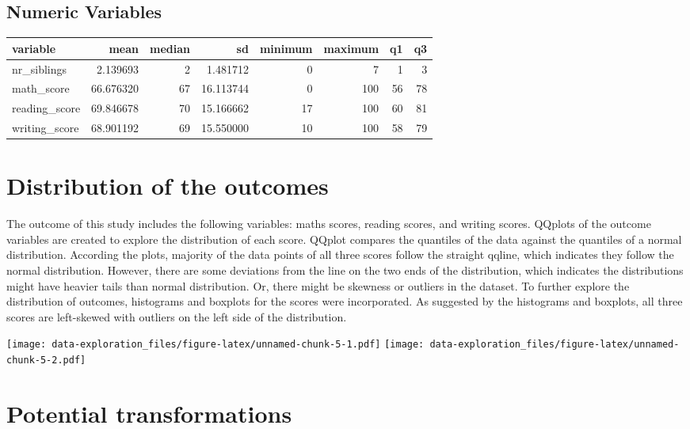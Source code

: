 \documentclass[
  12pt,
]{article}
\begin{document}
\hypertarget{numeric-variables}{%
\subsection{Numeric Variables}\label{numeric-variables}}

\begin{longtable}[]{@{}lrrrrrrr@{}}
\toprule\noalign{}
variable & mean & median & sd & minimum & maximum & q1 & q3 \\
\midrule\noalign{}
\endhead
\bottomrule\noalign{}
\endlastfoot
nr\_siblings & 2.139693 & 2 & 1.481712 & 0 & 7 & 1 & 3 \\
math\_score & 66.676320 & 67 & 16.113744 & 0 & 100 & 56 & 78 \\
reading\_score & 69.846678 & 70 & 15.166662 & 17 & 100 & 60 & 81 \\
writing\_score & 68.901192 & 69 & 15.550000 & 10 & 100 & 58 & 79 \\
\end{longtable}

\hypertarget{distribution-of-the-outcomes}{%
\section{Distribution of the
outcomes}\label{distribution-of-the-outcomes}}

The outcome of this study includes the following variables: maths
scores, reading scores, and writing scores. QQplots of the outcome
variables are created to explore the distribution of each score. QQplot
compares the quantiles of the data against the quantiles of a normal
distribution. According the plots, majority of the data points of all
three scores follow the straight qqline, which indicates they follow the
normal distribution. However, there are some deviations from the line on
the two ends of the distribution, which indicates the distributions
might have heavier tails than normal distribution. Or, there might be
skewness or outliers in the dataset. To further explore the distribution
of outcomes, histograms and boxplots for the scores were incorporated.
As suggested by the histograms and boxplots, all three scores are
left-skewed with outliers on the left side of the distribution.

\texttt{[image: data-exploration\_files/figure-latex/unnamed-chunk-5-1.pdf]}
\texttt{[image: data-exploration\_files/figure-latex/unnamed-chunk-5-2.pdf]}

\hypertarget{potential-transformations}{%
\section{Potential transformations}\label{potential-transformations}}
\end{document}
